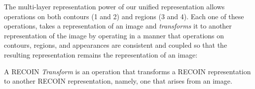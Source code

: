 





The multi-layer representation power of our unified representation allows operations on both contours (1 and 2) and regions (3 and 4). Each one of these operations, takes a representation of an image and \emph{transforms} it to another representation of the image by operating in a manner that operations on contours, regions, and appearances are consistent and coupled so that the resulting representation remains the representation of an image:

\begin{definition}
A RECOIN \emph{Transform} is an operation that transforms a RECOIN representation to another RECOIN representation, namely, one that arises from an image.
\label{def:transform}
\end{definition}


